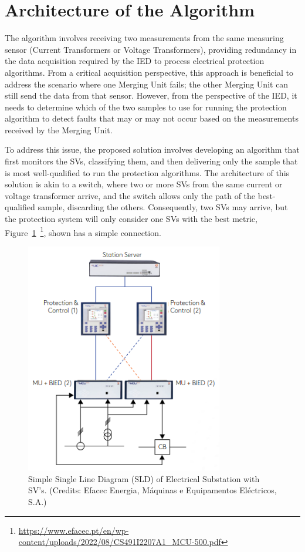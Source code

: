 \section{Architecture of the Algorithm}

The algorithm involves receiving two measurements from the same measuring sensor (Current Transformers or Voltage Transformers), providing redundancy in the data acquisition required by the IED to process electrical protection algorithms. From a critical acquisition perspective, this approach is beneficial to address the scenario where one Merging Unit fails; the other Merging Unit can still send the data from that sensor. However, from the perspective of the IED, it needs to determine which of the two samples to use for running the protection algorithm to detect faults that may or may not occur based on the measurements received by the Merging Unit.

To address this issue, the proposed solution involves developing an algorithm that first monitors the SVs, classifying them, and then delivering only the sample that is most well-qualified to run the protection algorithms. The architecture of this solution is akin to a switch, where two or more SVs from the same current or voltage transformer arrive, and the switch allows only the path of the best-qualified sample, discarding the others. Consequently, two SVs may arrive, but the protection system will only consider one SVs with the best metric, Figure~\ref{fig:SLD_Diagram}~\footnote{\url{https://www.efacec.pt/en/wp-content/uploads/2022/08/CS491I2207A1_MCU-500.pdf}}, shown has a simple connection.

\begin{figure}[tbh]
	\centering
	\includegraphics[width=0.77\textwidth, keepaspectratio]{ch3/assets/SLD_Diagram.png}
	\caption{Simple Single Line Diagram (SLD) of Electrical Substation with SV's. (Credits: Efacec Energia, Máquinas e Equipamentos Eléctricos, S.A.)}
	\label{fig:SLD_Diagram}
\end{figure}
\FloatBarrier
